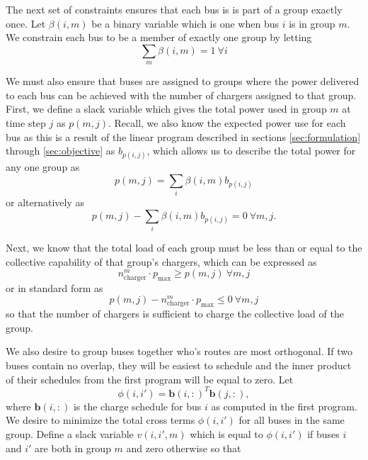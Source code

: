 \par The next set of constraints ensures that each bus is is part of a group exactly once. Let $\beta(i,m)$ be a binary variable which is one when bus $i$ is in group $m$. We constrain each bus to be a member of exactly one group by letting
\begin{equation*}
	\sum_m\beta(i,m) = 1 \ \forall i
\end{equation*}
\par We must also ensure that buses are assigned to groups where the power delivered to each bus can be achieved with the number of chargers assigned to that group. First, we define a slack variable which gives the total power used in group $m$ at time step $j$ as $p(m,j)$. Recall, we also know the expected power use for each bus as this is a result of the linear program described in sections \ref{sec:formulation} through \ref{sec:objective} as $b_{p(i,j)}$, which allows us to describe the total power for any one group as
\begin{equation*}
 p(m,j) = \sum_i\beta(i,m)b_{p(i,j)}
\end{equation*}
or alternatively as
\begin{equation}
	p(m,j) - \sum_i\beta(i,m)b_{p(i,j)} = 0 \ \forall m,j.
\end{equation} 
\par Next, we know that the total load of each group must be less than or equal to the collective capability of that group's chargers, which can be expressed as
\begin{equation*}
	n^m_{\text{charger}}\cdot p_{\text{max}} \ge p(m,j) \ \forall m,j
\end{equation*}
or in standard form as 
\begin{equation}
	p(m,j) - n^m_{\text{charger}}\cdot p_{\text{max}} \le 0\ \forall m,j
\end{equation}
so that the number of chargers is sufficient to charge the collective load of the group. 
\par We also desire to group buses together who's routes are most orthogonal. If two buses contain no overlap, they will be easiest to schedule and the inner product of their schedules from the first program will be equal to zero. Let 
\begin{equation*}
\phi(i,i') = \mathbf{b}(i,:)^T\mathbf{b}(j,:),
\end{equation*}
where $\mathbf{b}(i,:)$ is the charge schedule for bus $i$ as computed in the first program. We desire to minimize the total cross terms $\phi(i,i')$ for all buses in the same group.  Define a slack variable $v(i,i',m)$ which is equal to $\phi(i,i')$ if buses $i$ and $i'$ are both in group $m$ and zero otherwise so that
